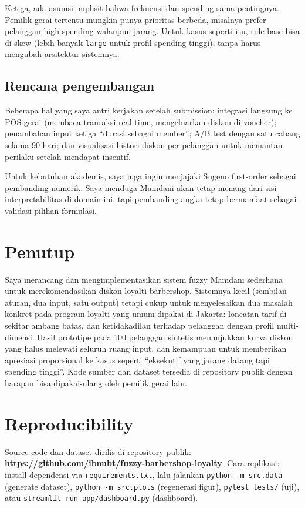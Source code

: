 \documentclass[conference]{IEEEtran}
\begin{document}
Ketiga, ada asumsi implisit bahwa frekuensi dan spending sama
pentingnya. Pemilik gerai tertentu mungkin punya prioritas berbeda,
misalnya prefer pelanggan high-spending walaupun jarang. Untuk kasus
seperti itu, rule base bisa di-skew (lebih banyak \texttt{large} untuk
profil spending tinggi), tanpa harus mengubah arsitektur sistemnya.

\subsection{Rencana pengembangan}

Beberapa hal yang saya antri kerjakan setelah submission: integrasi
langsung ke POS gerai (membaca transaksi real-time, mengeluarkan diskon
di voucher); penambahan input ketiga ``durasi sebagai member''; A/B test
dengan satu cabang selama 90 hari; dan visualisasi histori diskon per
pelanggan untuk memantau perilaku setelah mendapat insentif.

Untuk kebutuhan akademis, saya juga ingin menjajaki Sugeno first-order
sebagai pembanding numerik. Saya menduga Mamdani akan tetap menang dari
sisi interpretabilitas di domain ini, tapi pembanding angka tetap
bermanfaat sebagai validasi pilihan formulasi.

\section{Penutup}

Saya merancang dan mengimplementasikan sistem fuzzy Mamdani sederhana
untuk merekomendasikan diskon loyalti barbershop. Sistemnya kecil
(sembilan aturan, dua input, satu output) tetapi cukup untuk
menyelesaikan dua masalah konkret pada program loyalti yang umum dipakai
di Jakarta: loncatan tarif di sekitar ambang batas, dan ketidakadilan
terhadap pelanggan dengan profil multi-dimensi. Hasil prototipe pada 100
pelanggan sintetis menunjukkan kurva diskon yang halus melewati seluruh
ruang input, dan kemampuan untuk memberikan apresiasi proporsional ke
kasus seperti ``eksekutif yang jarang datang tapi spending tinggi''.
Kode sumber dan dataset tersedia di repository publik dengan harapan
bisa dipakai-ulang oleh pemilik gerai lain.

\section*{Reproducibility}
Source code dan dataset dirilis di repository publik:
\textbf{\url{https://github.com/ibnubt/fuzzy-barbershop-loyalty}}.
Cara replikasi: install dependensi via \texttt{requirements.txt}, lalu
jalankan \texttt{python -m src.data} (generate dataset),
\texttt{python -m src.plots} (regenerasi figur), \texttt{pytest tests/}
(uji), atau \texttt{streamlit run app/dashboard.py} (dashboard).



\end{document}
